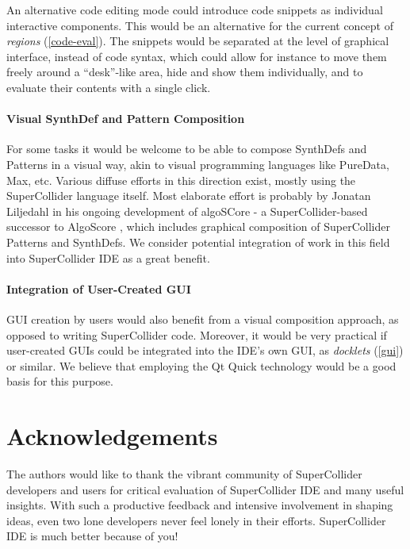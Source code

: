 \documentclass[11pt,a4paper]{article}
\begin{document}
An alternative code editing mode could introduce code snippets as individual interactive components. This would be
an alternative for the current concept of \emph{regions} (\ref{code-eval}). The snippets would be separated at the
level of graphical interface, instead of code syntax, which could allow for instance to move them freely around a
``desk''-like area, hide and show them individually, and to evaluate their contents with a single click.

\paragraph{Visual SynthDef and Pattern Composition} \hfill

For some tasks it would be welcome to be able to compose SynthDefs and Patterns in a visual way, akin to visual
programming languages like PureData, Max, etc. Various diffuse efforts in this direction exist, mostly using the
SuperCollider language itself. Most elaborate effort is probably by Jonatan Liljedahl in his ongoing development of
algoSCore - a SuperCollider-based successor to AlgoScore \cite{algoscore}, which includes graphical composition of
SuperCollider Patterns and SynthDefs. We consider potential integration of work in this field into SuperCollider IDE as
a great benefit.

\paragraph{Integration of User-Created GUI} \hfill

GUI creation by users would also benefit from a visual composition approach, as opposed to writing SuperCollider code.
Moreover, it would be very practical if user-created GUIs could be integrated into the IDE's own GUI, as
\emph{docklets} (\ref{gui}) or similar. We believe that employing the Qt Quick technology would be a good basis for this
purpose.


\section{Acknowledgements}

The authors would like to thank the vibrant community of SuperCollider developers and users for critical evaluation of
SuperCollider IDE and many useful insights. With such a productive feedback and intensive involvement in shaping ideas,
even two lone developers never feel lonely in their efforts. SuperCollider IDE is much better because of you!



\end{document}
